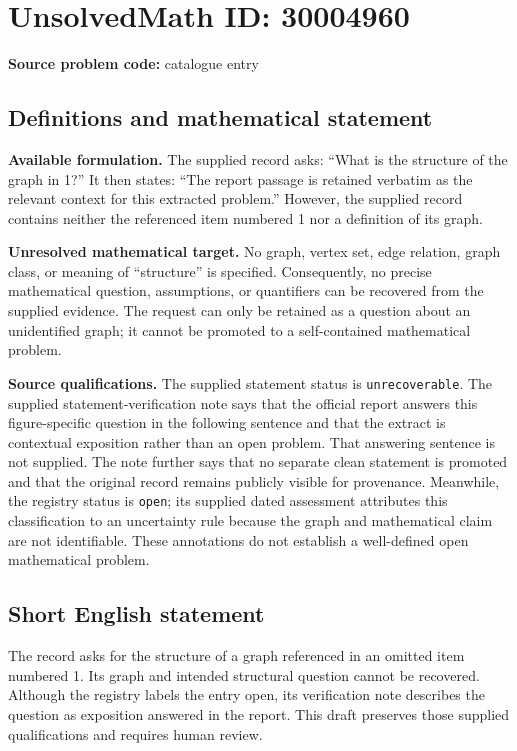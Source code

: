 \documentclass[11pt]{article}
\begin{document}
\section*{UnsolvedMath ID: 30004960}
\textbf{Source problem code:} catalogue entry
\subsection{Definitions and mathematical statement}
\textbf{Available formulation.} The supplied record asks: ``What is the structure of the graph in 1?'' It then states: ``The report passage is retained verbatim as the relevant context for this extracted problem.'' However, the supplied record contains neither the referenced item numbered 1 nor a definition of its graph.

\textbf{Unresolved mathematical target.} No graph, vertex set, edge relation, graph class, or meaning of ``structure'' is specified. Consequently, no precise mathematical question, assumptions, or quantifiers can be recovered from the supplied evidence. The request can only be retained as a question about an unidentified graph; it cannot be promoted to a self-contained mathematical problem.

\textbf{Source qualifications.} The supplied statement status is \texttt{unrecoverable}. The supplied statement-verification note says that the official report answers this figure-specific question in the following sentence and that the extract is contextual exposition rather than an open problem. That answering sentence is not supplied. The note further says that no separate clean statement is promoted and that the original record remains publicly visible for provenance. Meanwhile, the registry status is \texttt{open}; its supplied dated assessment attributes this classification to an uncertainty rule because the graph and mathematical claim are not identifiable. These annotations do not establish a well-defined open mathematical problem.
\subsection{Short English statement}
The record asks for the structure of a graph referenced in an omitted item numbered 1. Its graph and intended structural question cannot be recovered. Although the registry labels the entry open, its verification note describes the question as exposition answered in the report. This draft preserves those supplied qualifications and requires human review.
\end{document}
